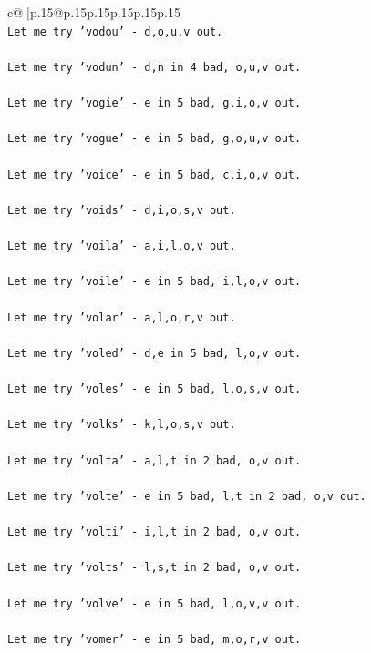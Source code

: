 \documentclass{article}
\begin{document}
{\begin{supertabular}{c@{$\;$}|p{.15\linewidth}@{}p{.15\linewidth}p{.15\linewidth}p{.15\linewidth}p{.15\linewidth}p{.15\linewidth}}
{{{\\ 
\texttt{Let me try 'vodou' {-} d,o,u,v out. } \\
\\ 
\texttt{Let me try 'vodun' {-} d,n in 4 bad, o,u,v out. } \\
\\ 
\texttt{Let me try 'vogie' {-} e in 5 bad, g,i,o,v out. } \\
\\ 
\texttt{Let me try 'vogue' {-} e in 5 bad, g,o,u,v out. } \\
\\ 
\texttt{Let me try 'voice' {-} e in 5 bad, c,i,o,v out. } \\
\\ 
\texttt{Let me try 'voids' {-} d,i,o,s,v out. } \\
\\ 
\texttt{Let me try 'voila' {-} a,i,l,o,v out. } \\
\\ 
\texttt{Let me try 'voile' {-} e in 5 bad, i,l,o,v out. } \\
\\ 
\texttt{Let me try 'volar' {-} a,l,o,r,v out. } \\
\\ 
\texttt{Let me try 'voled' {-} d,e in 5 bad, l,o,v out. } \\
\\ 
\texttt{Let me try 'voles' {-} e in 5 bad, l,o,s,v out. } \\
\\ 
\texttt{Let me try 'volks' {-} k,l,o,s,v out. } \\
\\ 
\texttt{Let me try 'volta' {-} a,l,t in 2 bad, o,v out. } \\
\\ 
\texttt{Let me try 'volte' {-} e in 5 bad, l,t in 2 bad, o,v out. } \\
\\ 
\texttt{Let me try 'volti' {-} i,l,t in 2 bad, o,v out. } \\
\\ 
\texttt{Let me try 'volts' {-} l,s,t in 2 bad, o,v out. } \\
\\ 
\texttt{Let me try 'volve' {-} e in 5 bad, l,o,v,v out. } \\
\\ 
\texttt{Let me try 'vomer' {-} e in 5 bad, m,o,r,v out. } \\
\\ 
}}}
\end{supertabular}}
\end{document}
